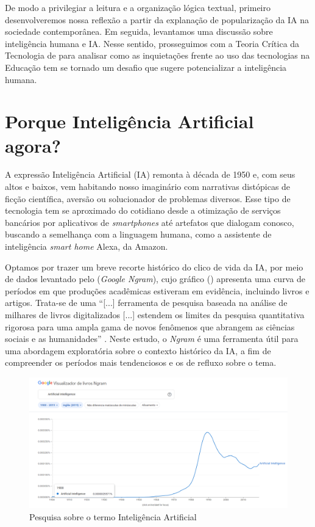 \documentclass[portuguese]{textolivre}
\begin{document}
De modo a privilegiar a leitura e a organização lógica textual, primeiro desenvolveremos nossa reflexão a partir da explanação de popularização da IA na sociedade contemporânea. Em seguida, levantamos uma discussão sobre inteligência humana e IA. Nesse sentido, prosseguimos com a Teoria Crítica da Tecnologia de \textcite{feenberg2003, feenberg2004} para analisar como as inquietações frente ao uso das tecnologias na Educação tem se tornado um desafio que sugere potencializar a inteligência humana.
 

\section{Porque Inteligência Artificial agora?}

A expressão Inteligência Artificial (IA) remonta à década de 1950 \cite{santaella2023inteligencia} e, com seus altos e baixos, vem habitando nosso imaginário com narrativas distópicas de ficção científica, aversão ou solucionador de problemas diversos. Esse tipo de tecnologia tem se aproximado do cotidiano desde a otimização de serviços bancários por aplicativos de \emph{smartphones} até artefatos que dialogam conosco, buscando a semelhança com a linguagem humana, como a assistente de inteligência \emph{smart home} Alexa, da Amazon.

Optamos por trazer um breve recorte histórico do clico de vida da IA, por meio de dados levantado pelo \textcite{google} (\emph{Google Ngram}), cujo gráfico () apresenta uma curva de períodos em que produções acadêmicas estiveram em evidência, incluindo livros e artigos. Trata-se de uma “[...] ferramenta de pesquisa baseada na análise de milhares de livros digitalizados [...] estendem os limites da pesquisa quantitativa rigorosa para uma ampla gama de novos fenômenos que abrangem as ciências sociais e as humanidades” \cite[p. 125]{massaroo2020} . Neste estudo, o \emph{Ngram} é uma ferramenta útil para uma abordagem exploratória sobre o contexto histórico da IA, a fim de compreender os períodos mais tendenciosos e os de refluxo sobre o tema.

\begin{figure}[htbp]
\centering
\begin{minipage}{1\textwidth}
 \includegraphics[width=\textwidth]{Fig1.png}
 \caption{Pesquisa sobre o termo Inteligência Artificial}
 \label{fig1}
\end{minipage}
\end{figure}
\end{document}
